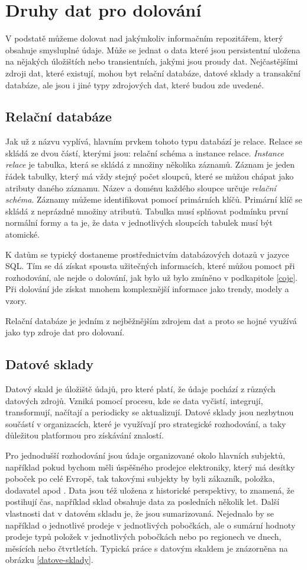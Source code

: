 \section{Druhy dat pro dolování}
V podstatě můžeme dolovat nad jakýmkoliv informačním repozitářem, který obsahuje smysluplné údaje. Může se jednat o data které jsou persistentní uložena na nějakých úložištích nebo transientních, jakými jsou proudy dat. Nejčastějšími zdroji dat, které existují, mohou byt relační databáze, datové sklady a transakční databáze, ale jsou i jiné typy zdrojových dat, které budou zde uvedené. \cite{Han} 

\subsection*{Relační databáze}
Jak už z názvu vyplívá, hlavním prvkem tohoto typu databází je relace. Relace se skládá ze dvou částí, kterými jsou: relační schéma a instance relace. \textit{Instance relace} je tabulka, která se skládá z množiny několika záznamů. Záznam je jeden řádek tabulky, který má vždy stejný počet sloupců, které se můžou chápat jako atributy daného záznamu. Název a doménu každého sloupce určuje \textit{relační schéma}. Záznamy můžeme identifikovat pomocí primárních klíčů. Primární klíč se skládá z neprázdné množiny atributů. Tabulka musí splňovat podmínku první normální formy a ta je, že data v jednotlivých sloupcích tabulek musí být atomické. \cite{Elmasri}

K datům se typický dostaneme prostřednictvím databázových dotazů v jazyce SQL. Tím se dá získat spousta užitečných informacích, které můžou pomoct při rozhodování, ale nejde o dolování, jak bylo už bylo zmíněno v podkapitole \ref{coje}. Při dolování jde získat mnohem komplexnější informace jako trendy, modely a vzory.

Relační databáze je jedním z nejběžnějším zdrojem dat a proto se hojné využívá jako typ zdroje dat pro dolovaní.
\subsection*{Datové sklady}
Datový skald je úložiště údajů, pro které platí, že údaje pochází z různých datových zdrojů. Vzniká pomocí procesu, kde se data vyčistí, integrují, transformují, načítají a periodicky se aktualizují. Datové sklady jsou nezbytnou součástí v organizacích, které je využívají pro strategické rozhodování, a taky důležitou platformou pro získávání znalostí. \cite{Fernando}

Pro jednodušší rozhodování jsou údaje organizované okolo hlavních subjektů, například pokud bychom měli úspěšného prodejce elektroniky, který má desítky poboček po celé Evropě, tak takovými subjekty by byli zákazník, položka, dodavatel apod \cite{Han}. Data jsou též uložena z historické perspektivy, to znamená, že postihují čas, například sklad obsahuje data za posledních několik let. Další vlastnosti dat v datovém skladu je, že jsou sumarizovaná. Nejednalo by se například o jednotlivé prodeje v jednotlivých pobočkách, ale o sumární hodnoty prodeje typů položek v jednotlivých pobočkách nebo po regionech ve dnech, měsících nebo čtvrtletích. Typická práce s datovým skaldem je znázorněna na obrázku \ref{datove-sklady}.

